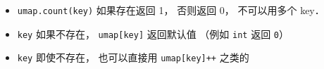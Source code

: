 
\begin{issues}
\issueDraft
\end{issues}

\begin{itemize}
\item \verb|umap.count(key)| 如果存在返回 1， 否则返回 0， 不可以用多个 key．
\item \verb|key| 如果不存在， \verb|umap[key]| 返回默认值 （例如 \verb|int| 返回 \verb|0|）
\item \verb|key| 即使不存在， 也可以直接用 \verb|umap[key]++| 之类的
\end{itemize}
